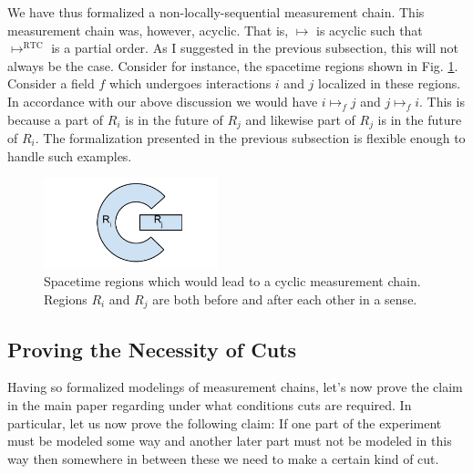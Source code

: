 \documentclass[12pt,prd,superscriptaddress,floatfix,amsmath,amssymb,amsfonts,nofootinbib]{revtex4-2}
\begin{document}
We have thus formalized a non-locally-sequential measurement chain. This measurement chain was, however, acyclic. That is, $\mapsto$ is acyclic such that $\mapsto^\text{RTC}$ is a partial order. As I suggested in the previous subsection, this will not always be the case. Consider for instance, the spacetime regions shown in Fig. \ref{FigCyclic}. Consider a field $f$ which undergoes interactions $i$ and $j$ localized in these regions. In accordance with our above discussion we would have $i\mapsto_f j$ and $j\mapsto_f i$. This is because a part of $R_i$ is in the future of $R_j$ and likewise part of $R_j$ is in the future of $R_i$. The formalization presented in the previous subsection is flexible enough to handle such examples. 

\begin{figure}
\includegraphics[width=0.45\textwidth]{Figures/CyclicDiagram.pdf}
\caption{Spacetime regions which would lead to a cyclic measurement chain. Regions $R_i$ and $R_j$ are both before and after each other in a sense.}\label{FigCyclic}
\end{figure}

\subsection{Proving the Necessity of Cuts} 
Having so formalized modelings of measurement chains, let's now prove the claim in the main paper regarding under what conditions cuts are required. In particular, let us now prove the following claim: If one part of the experiment must be modeled some way and another later part must not be modeled in this way then somewhere in between these we need to make a certain kind of cut. 
\end{document}
